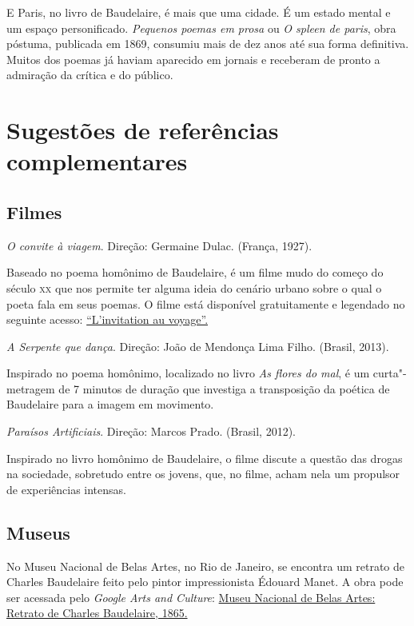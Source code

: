 \documentclass[12pt]{extarticle}
\begin{document}


E Paris, no livro de Baudelaire, é mais que uma cidade. É um estado
mental e um espaço personificado.
\emph{Pequenos poemas em prosa} ou \emph{O spleen de paris}, obra póstuma,
publicada em 1869, consumiu mais de dez anos até sua forma definitiva.
Muitos dos poemas já haviam aparecido em jornais e receberam de pronto a
admiração da crítica e do público.

\section{Sugestões de referências complementares}\label{sugestoes}

\subsection{Filmes}

\textit{O convite à viagem}. Direção: Germaine Dulac. (França, 1927).

Baseado no poema homônimo de Baudelaire, é um filme mudo do começo do século \textsc{xx}
que nos permite ter alguma ideia do cenário urbano sobre o qual o poeta fala em seus poemas.
O filme está disponível gratuitamente e legendado no seguinte acesso: \href{https://www.youtube.com/watch?v=wCZgaPcs6Y0}{``L'invitation au voyage''.}

\textit{A Serpente que dança}. Direção: João de Mendonça Lima Filho. (Brasil, 2013).

Inspirado no poema homônimo, localizado no livro \textit{As flores do mal}, é um curta"-metragem
de 7 minutos de duração que investiga a transposição da poética de Baudelaire para a imagem em movimento.

\textit{Paraísos Artificiais}. Direção: Marcos Prado. (Brasil, 2012).

Inspirado no livro homônimo de Baudelaire, o filme discute a questão das drogas na sociedade,
sobretudo entre os jovens, que, no filme, acham nela um propulsor de experiências intensas.

\subsection{Museus}

No Museu Nacional de Belas Artes, no Rio de Janeiro, se encontra um retrato de Charles 
Baudelaire feito pelo pintor impressionista Édouard Manet. A obra pode ser acessada
pelo \emph{Google Arts and Culture}: \href{https://artsandculture.google.com/asset/retrato-de-charles-baudelaire-%C3%89douard-manet/yAFFnToINzBuUg?hl=pt-br}{Museu Nacional de Belas Artes: Retrato de Charles Baudelaire, 1865.}
\end{document}
